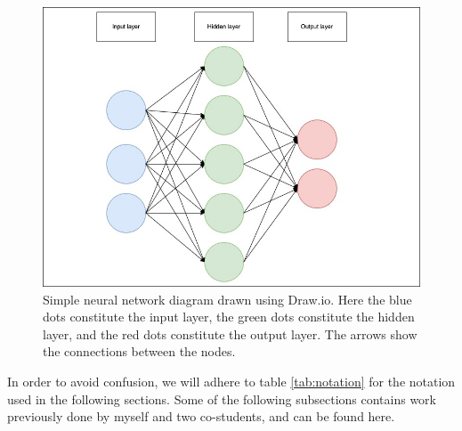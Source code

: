 \begin{figure}[h!]
    \includegraphics[width=\linewidth]{Figures/Machinelearning/nn_diagram.jpeg}
    \caption[Simple diagram of a neural network]{Simple neural network diagram drawn using Draw.io. Here the blue dots constitute the input layer, the green dots constitute the hidden layer, 
    and the red dots constitute the output layer. The arrows show the connections between the nodes. }
    \label{fig:nndiagram}
\end{figure}

In order to avoid confusion, we will adhere to table \ref{tab:notation} for the notation used in the following sections.
Some of the following subsections contains work previously done by myself and two co-students, and can be found here\cite{FYSSTK}.

